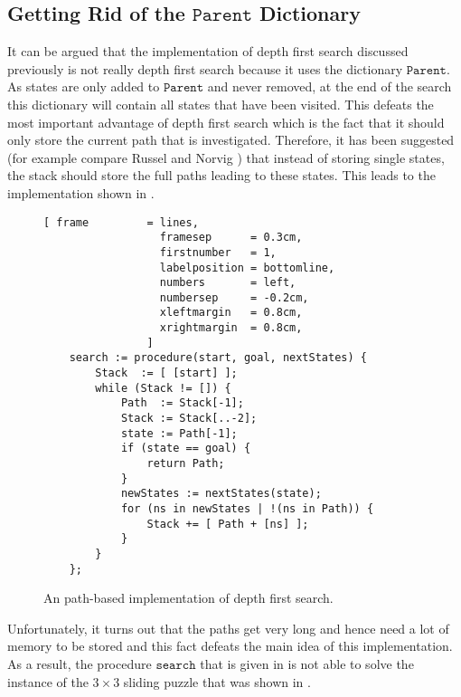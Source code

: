 \subsection{Getting Rid of the $\mathtt{Parent}$ Dictionary}
It can be argued that the implementation of depth first search discussed previously is not really
depth first search because it uses the dictionary $\mathtt{Parent}$.  As states are only added to
$\mathtt{Parent}$ and never removed, at the end of the search this dictionary will contain all
states that have been visited.  This defeats the most important advantage of depth first search
which is the fact that it should only store the current path that is investigated.  Therefore,
it has been suggested (for example compare Russel and Norvig \cite{russell:2009}) that instead of
storing single states, the stack should store the full paths leading to these states.  This leads to
the implementation shown in .

\begin{figure}[!ht]
\centering
\begin{Verbatim}[ frame         = lines,
                  framesep      = 0.3cm,
                  firstnumber   = 1,
                  labelposition = bottomline,
                  numbers       = left,
                  numbersep     = -0.2cm,
                  xleftmargin   = 0.8cm,
                  xrightmargin  = 0.8cm,
                ]
    search := procedure(start, goal, nextStates) {
        Stack  := [ [start] ];
        while (Stack != []) {
            Path  := Stack[-1];
            Stack := Stack[..-2];
            state := Path[-1];
            if (state == goal) {
                return Path;
            }
            newStates := nextStates(state);
            for (ns in newStates | !(ns in Path)) {
                Stack += [ Path + [ns] ];
            }
        }
    };
\end{Verbatim}
\vspace*{-0.3cm}
\caption{An path-based implementation of depth first search.}
\label{fig:depth-first-search-path.stlx}
\end{figure}

Unfortunately, it  turns out that the paths get very long and hence need a lot of memory to be
stored and this fact defeats the main idea of this implementation.  As a result, the procedure
$\mathtt{search}$ that is given in  is not able to solve the
instance of the  $3 \times 3$ sliding puzzle that was shown in .

